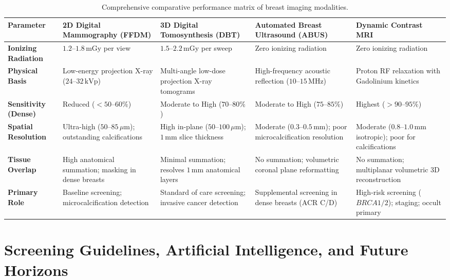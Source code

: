 \documentclass[11pt,a4paper]{article}
\begin{document}
\begin{table}[htbp]
\centering
\small
\setlength{\tabcolsep}{3pt}
\begin{tabular}{p{2.6cm}p{2.8cm}p{2.9cm}p{2.8cm}p{2.9cm}}
\toprule
\textbf{Parameter} & \textbf{2D Digital Mammography (FFDM)} & \textbf{3D Digital Tomosynthesis (DBT)} & \textbf{Automated Breast Ultrasound (ABUS)} & \textbf{Dynamic Contrast MRI} \\
\midrule
\textbf{Ionizing Radiation} & $1.2\text{--}1.8\,\text{mGy}$ per view & $1.5\text{--}2.2\,\text{mGy}$ per sweep & Zero ionizing radiation & Zero ionizing radiation \\
\addlinespace
\textbf{Physical Basis} & Low-energy projection X-ray ($24\text{--}32\,\text{kVp}$) & Multi-angle low-dose projection X-ray tomograms & High-frequency acoustic reflection ($10\text{--}15\,\text{MHz}$) & Proton RF relaxation with Gadolinium kinetics \\
\addlinespace
\textbf{Sensitivity (Dense)} & Reduced ($< 50\text{--}60\%$) & Moderate to High ($70\text{--}80\%$) & Moderate to High ($75\text{--}85\%$) & Highest ($> 90\text{--}95\%$) \\
\addlinespace
\textbf{Spatial Resolution} & Ultra-high ($50\text{--}85\,\mu\text{m}$); outstanding calcifications & High in-plane ($50\text{--}100\,\mu\text{m}$); $1\,\text{mm}$ slice thickness & Moderate ($0.3\text{--}0.5\,\text{mm}$); poor microcalcification resolution & Moderate ($0.8\text{--}1.0\,\text{mm}$ isotropic); poor for calcifications \\
\addlinespace
\textbf{Tissue Overlap} & High anatomical summation; masking in dense breasts & Minimal summation; resolves $1\,\text{mm}$ anatomical layers & No summation; volumetric coronal plane reformatting & No summation; multiplanar volumetric 3D reconstruction \\
\addlinespace
\textbf{Primary Role} & Baseline screening; microcalcification detection & Standard of care screening; invasive cancer detection & Supplemental screening in dense breasts (ACR C/D) & High-risk screening ($BRCA1/2$); staging; occult primary \\
\bottomrule
\end{tabular}
\caption{Comprehensive comparative performance matrix of breast imaging modalities.}
\label{tab:modality_comparison}
\end{table}

\section{Screening Guidelines, Artificial Intelligence, and Future Horizons}
\end{document}
